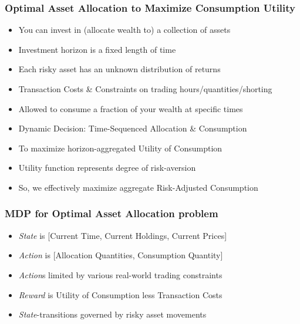 \documentclass[handout]{beamer}
\begin{document}
\begin{frame}
\frametitle{Optimal Asset Allocation to Maximize Consumption Utility}
\pause
\begin{itemize}[<+->]
\item You can invest in (allocate wealth to) a collection of assets
\item Investment horizon is a fixed length of time
\item Each risky asset has an unknown distribution of returns
\item Transaction Costs \& Constraints on trading hours/quantities/shorting
\item Allowed to consume a fraction of your wealth at specific times
\item Dynamic Decision: Time-Sequenced Allocation \& Consumption
\item To maximize horizon-aggregated Utility of Consumption
\item Utility function represents degree of risk-aversion
\item So, we effectively maximize aggregate Risk-Adjusted Consumption
\end{itemize}
\end{frame}



\begin{frame}
\frametitle{MDP for Optimal Asset Allocation problem}
\pause
\begin{itemize}[<+->]
\item {\em State} is [Current Time, Current Holdings, Current Prices]
\item {\em Action} is [Allocation Quantities, Consumption Quantity]
\item {\em Action}s limited by various real-world trading constraints
\item {\em Reward} is Utility of Consumption less Transaction Costs
\item {\em State}-transitions governed by risky asset movements
\end{itemize}
\end{frame}
\end{document}
